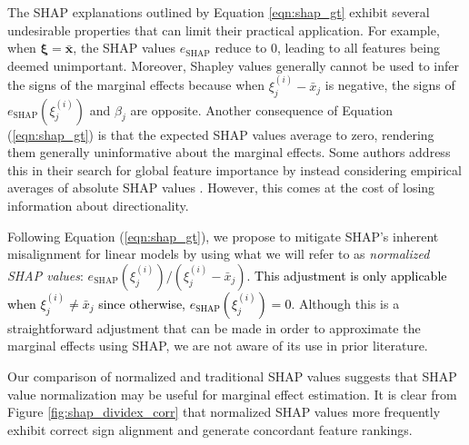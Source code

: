 \documentclass[mnsc,blindrev]{informs3}
\begin{document}
            
The SHAP explanations outlined by Equation \ref{eqn:shap_gt} exhibit several undesirable properties that can limit their practical application. For example, when $\boldsymbol{\xi}=\bar{\mathbf{x}}$, the SHAP values $e_\text{SHAP}$ reduce to 0, leading to all features being deemed unimportant. Moreover, Shapley values generally cannot be used to infer the signs of the marginal effects because when $\xi^{(i)}_j - \bar{x}_j$ is negative, the signs of $e_{\text{SHAP}}(\xi^{(i)}_j)$ and $\beta_j$ are opposite. Another consequence of Equation (\ref{eqn:shap_gt})  is that the expected SHAP values average to zero, rendering them generally uninformative about the marginal effects. Some authors address this in their search for global feature importance by instead considering empirical averages of absolute SHAP values \citep{lenaers23rent,maeng23vr,guenther2023useful}. However, this comes at the cost of losing information about directionality.

             Following Equation (\ref{eqn:shap_gt}), we propose to mitigate SHAP's inherent misalignment for linear models by using what we will refer to as \emph{normalized SHAP values}: $e_{\text{SHAP}}(\xi^{(i)}_j) / (\xi^{(i)}_j - \bar{x}_j)$. \textcolor{black}{This adjustment is only applicable when $\xi^{(i)}_j \neq \bar{x}_j$ since otherwise, $e_{\text{SHAP}}(\xi^{(i)}_j) = 0$}. Although this is a straightforward adjustment that can be made in order to approximate the marginal effects using SHAP, we are not aware of its use in prior literature.  
             
             Our comparison of normalized and traditional SHAP values suggests that SHAP value normalization may be useful for marginal effect estimation. It is clear from Figure \ref{fig:shap_dividex_corr} that normalized SHAP values more frequently exhibit correct sign alignment and generate concordant feature rankings. %
             
\end{document}
